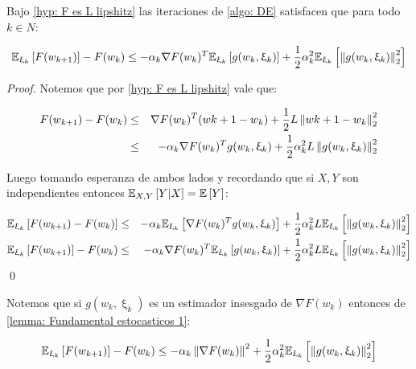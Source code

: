 \begin{lemma}
	\label{lemma: Fundamental estocasticos 1}
	Bajo \ref{hyp: F es L lipshitz} las iteraciones de \ref{algo: DE} satisfacen que para todo $k \in N$:
	
	\begin{equation}
		\mathbb{E}_{\upxi_{k}} \left[F(w_{k+1})\right] - F(w_k) \leq - \alpha_k \nabla F(w_k) ^T \mathbb{E}_{\upxi_{k}} \left[g(w_k, \upxi_{k})\right] + \frac{1}{2} \alpha_k^2 \mathbb{E}_{\upxi_{k}} \left[\left\lVert g(w_k, \upxi_{k})\right\rVert^2_2\right]
	\end{equation}
	
\end{lemma}

\begin{proof}
	Notemos que por \ref{hyp: F es L lipshitz} vale que:
	
	\begin{equation*}
		\begin{aligned}
			F(w_{k+1}) - F(w_k) & \leq &  \nabla F(w_k)^T(w{k+1}-w_k) + \frac{1}{2}L \left\lVert w{k+1}-w_k\right\rVert^2_2 \\
			& \leq & - \alpha_k \nabla F(w_k)^Tg(w_k, \upxi_{k}) + \frac{1}{2} \alpha_k^2 L \left\lVert g(w_k, \upxi_{k})\right\rVert^2_2 
		\end{aligned}
	\end{equation*}
	
	
	Luego tomando esperanza de ambos lados y recordando que si $X,Y$ son independientes entonces $\mathbb{E}_{X,Y} \left[Y \vert X\right] = \mathbb{E} \left[Y\right]$:
	
	\begin{equation*}
		\begin{aligned}
				\mathbb{E}_{\upxi_{k}} \left[F(w_{k+1}) - F(w_k)\right] & \leq & - \alpha_k \mathbb{E}_{\upxi_{k}} \left[\nabla F(w_k)^Tg(w_k, \upxi_{k})\right] + \frac{1}{2} \alpha_k^2 L \mathbb{E}_{\upxi_{k}} \left[\left\lVert g(w_k, \upxi_{k})\right\rVert^2_2 \right] \\
				\mathbb{E}_{\upxi_{k}} \left[F(w_{k+1})\right] - F(w_k) & \leq & - \alpha_k \nabla F(w_k)^T \mathbb{E}_{\upxi_{k}} \left[g(w_k, \upxi_{k})\right]+ \frac{1}{2} \alpha_k^2 L \mathbb{E}_{\upxi_{k}} \left[\left\lVert g(w_k, \upxi_{k})\right\rVert^2_2 \right] 
		\end{aligned}
	\end{equation*}
	\qed
	
\end{proof}

\begin{remark}
	Notemos que si $g(w_k, \upxi_{k})$ es un estimador insesgado de $\nabla F (w_k)$ entonces de \ref{lemma: Fundamental estocasticos 1}:
	
		\begin{equation}
	\mathbb{E}_{\upxi_{k}} \left[F(w_{k+1})\right] - F(w_k) \leq - \alpha_k \left\lVert\nabla F(w_k)\right\rVert^2 + \frac{1}{2} \alpha_k^2 \mathbb{E}_{\upxi_{k}} \left[\left\lVert g(w_k, \upxi_{k})\right\rVert^2_2\right]
	\end{equation}
	
\end{remark}

